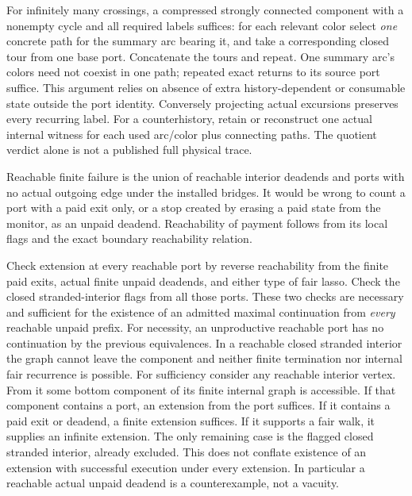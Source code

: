 \documentclass{article}
\begin{document}
For infinitely many crossings, a compressed strongly connected
component with a nonempty cycle and all required labels suffices:
for each relevant color select \emph{one} concrete path for the
summary arc bearing it, and take a corresponding closed tour from
one base port. Concatenate the tours and repeat. One summary arc's
colors need not coexist in one path; repeated exact returns to its
source port suffice. This argument relies on absence of extra
history-dependent or consumable state outside the port identity.
Conversely projecting actual excursions preserves every recurring
label. For a counterhistory, retain or reconstruct one actual
internal witness for each used arc/color plus connecting paths.
The quotient verdict alone is not a published full physical trace.

Reachable finite failure is the union of reachable interior deadends
and ports with no actual outgoing edge under the installed bridges.
It would be wrong to count a port with a paid exit only, or a stop
created by erasing a paid state from the monitor, as an unpaid deadend.
Reachability of payment follows from its local flags and the exact
boundary reachability relation.

Check extension at every reachable port by reverse reachability from
the finite paid exits, actual finite unpaid deadends, and either type
of fair lasso. Check the closed stranded-interior flags from all those
ports. These two checks are necessary and sufficient for the existence
of an admitted maximal continuation from \emph{every} reachable unpaid
prefix. For necessity, an unproductive reachable port has no continuation
by the previous equivalences. In a reachable closed stranded interior
the graph cannot leave the component and neither finite termination
nor internal fair recurrence is possible. For sufficiency consider
any reachable interior vertex. From it some bottom component of its
finite internal graph is accessible. If that component contains a port,
an extension from the port suffices. If it contains a paid exit or
deadend, a finite extension suffices. If it supports a fair walk, it
supplies an infinite extension. The only remaining case is the flagged
closed stranded interior, already excluded. This does not conflate
existence of an extension with successful execution under every
extension. In particular a reachable actual unpaid deadend is a
counterexample, not a vacuity.
\end{document}
